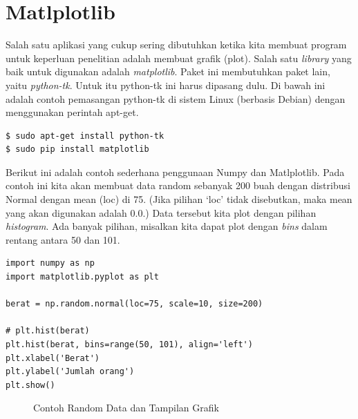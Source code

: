 \section{Matlplotlib}
Salah satu aplikasi yang cukup sering dibutuhkan ketika kita membuat program 
untuk keperluan penelitian adalah membuat grafik (plot). 
Salah satu {\em library} yang baik untuk digunakan adalah {\em matplotlib}. 
Paket ini membutuhkan paket lain, yaitu {\em python-tk}. 
Untuk itu python-tk ini harus dipasang dulu. 
Di bawah ini adalah contoh pemasangan python-tk di sistem Linux (berbasis Debian) 
dengan menggunakan perintah apt-get.

\begin{verbatim}
$ sudo apt-get install python-tk
$ sudo pip install matplotlib
\end{verbatim}

Berikut ini adalah contoh sederhana penggunaan Numpy dan Matlplotlib.
Pada contoh ini kita akan membuat data random sebanyak 200 buah
dengan distribusi Normal dengan mean (loc) di 75.
(Jika pilihan `loc' tidak disebutkan, maka mean yang akan digunakan adalah 0.0.)
Data tersebut kita plot dengan pilihan {\em histogram}.
Ada banyak pilihan, misalkan kita dapat plot dengan {\em bins}
dalam rentang antara 50 dan 101.

\begin{verbatim}
import numpy as np
import matplotlib.pyplot as plt

berat = np.random.normal(loc=75, scale=10, size=200)

# plt.hist(berat)
plt.hist(berat, bins=range(50, 101), align='left')
plt.xlabel('Berat')
plt.ylabel('Jumlah orang')
plt.show()
\end{verbatim}

\begin{figure}[ht]
\caption{Contoh Random Data dan Tampilan Grafik}
\label{fig:random-gausian}
\end{figure}

